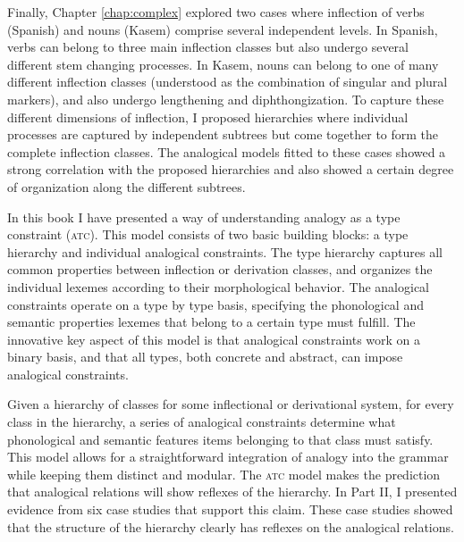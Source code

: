 Finally, Chapter \ref{chap:complex} explored two cases where inflection of verbs (Spanish) and nouns (Kasem) comprise several independent levels.
In Spanish, verbs can belong to three main inflection classes but also undergo several different stem changing processes.
In Kasem, nouns can belong to one of many different inflection classes (understood as the combination of singular and plural markers), and also undergo lengthening and diphthongization.
To capture these different dimensions of inflection, I proposed hierarchies where individual processes are captured by independent subtrees but come together to form the complete inflection classes.
The analogical models fitted to these cases showed a strong correlation with the proposed hierarchies and also showed a certain degree of organization along the different subtrees.

In this book I have presented a way of understanding analogy as a type constraint (\textsc{atc}).
This model consists of two basic building blocks: a type hierarchy and individual analogical constraints.
The type hierarchy captures all common properties between inflection or derivation classes, and organizes the individual lexemes according to their morphological behavior.
The analogical constraints operate on a type by type basis, specifying the phonological and semantic properties lexemes that belong to a certain type must fulfill.
The innovative key aspect of this model is that analogical constraints work on a binary basis, and that all types, both concrete and abstract, can impose analogical constraints.

Given a hierarchy of classes for some inflectional or derivational system, for every class in the hierarchy, a series of analogical constraints determine what phonological and semantic features items belonging to that class must satisfy.
This model allows for a straightforward integration of analogy into the grammar while keeping them distinct and modular.
The \textsc{atc} model makes the prediction that analogical relations will show reflexes of the hierarchy. In Part II, I presented evidence from six case studies that support this claim.
These case studies showed that the structure of the hierarchy clearly has reflexes on the analogical relations.

